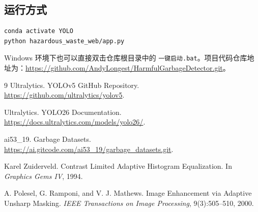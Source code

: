 \documentclass[UTF8,a4paper,12pt]{ctexart}
\begin{document}
\subsection{运行方式}

\begin{lstlisting}[language=bash,caption={命令行启动方式}]
conda activate YOLO
python hazardous_waste_web/app.py
\end{lstlisting}

Windows 环境下也可以直接双击仓库根目录中的 \texttt{一键启动.bat}。项目代码仓库地址为：\url{https://github.com/AndyLongest/HarmfulGarbageDetector.git}。

\begin{thebibliography}{9}
  Ultralytics.
  \newblock YOLOv5 GitHub Repository.
  \newblock \url{https://github.com/ultralytics/yolov5}.

  Ultralytics.
  \newblock YOLO26 Documentation.
  \newblock \url{https://docs.ultralytics.com/models/yolo26/}.

  ai53\_19.
  \newblock Garbage Datasets.
  \newblock \url{https://ai.gitcode.com/ai53_19/garbage_datasets.git}.

  Karel Zuiderveld.
  \newblock Contrast Limited Adaptive Histogram Equalization.
  \newblock In \emph{Graphics Gems IV}, 1994.

  A. Polesel, G. Ramponi, and V. J. Mathews.
  \newblock Image Enhancement via Adaptive Unsharp Masking.
  \newblock \emph{IEEE Transactions on Image Processing}, 9(3):505--510, 2000.
\end{thebibliography}
\end{document}
